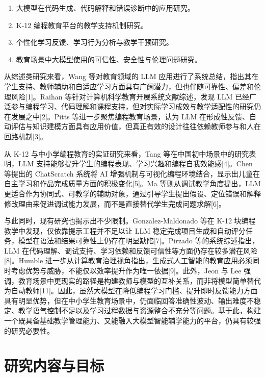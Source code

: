 \begin{enumerate}
\def\labelenumi{(\arabic{enumi})}
\tightlist
\item
  大模型在代码生成、代码解释和错误诊断中的应用研究。
\item
  K-12 编程教育平台的教学支持机制研究。
\item
  个性化学习反馈、学习行为分析与教学干预研究。
\item
  教育场景中大模型使用的可信性、安全性与伦理问题研究。
\end{enumerate}

从综述类研究来看，Wang 等对教育领域的 LLM 应用进行了系统总结，指出其在学生支持、教师辅助和自适应学习方面具有广阔潜力，但也伴随可靠性、偏差和伦理风险{[}1{]}。Raihan 等针对计算机科学教育开展系统文献综述，发现 LLM 已经广泛参与编程学习、代码理解和课程支持，但对实际学习成效与教学适配性的研究仍在发展之中{[}2{]}。Pitts 等进一步聚焦编程教育场景，认为 LLM 在形成性反馈、自动评估与知识建模方面具有应用价值，但真正有效的设计往往依赖教师参与和人在回路机制{[}3{]}。

从 K-12 与中小学编程教育的实证研究来看，Tang 等在中国初中场景中的研究表明，LLM 支持能够提升学生的编程表现、学习兴趣和编程自我效能感{[}4{]}。Chen 等提出的 ChatScratch 系统将 AI 增强机制与可视化编程环境结合，显示出儿童在自主学习和作品完成质量方面的积极变化{[}5{]}。Ma 等则从调试教学角度提出，LLM 更适合作为协同式、可教学的辅助对象，通过引导学生提出假设、定位错误和解释修改理由来促进调试能力发展，而不是直接替代学生完成问题求解{[}6{]}。

与此同时，现有研究也揭示出不少限制。Gonzalez-Maldonado 等在 K-12 块编程教学中发现，仅依靠提示工程并不足以让 LLM 稳定完成项目生成和自动评分任务，模型在语法和结果可靠性上仍存在明显缺陷{[}7{]}。Pirzado 等的系统综述指出，LLM 在代码理解、调试支持、学习依赖和反馈可信性等方面仍存在较多潜在风险{[}8{]}。Humble 进一步从计算教育治理视角指出，生成式人工智能的教育应用必须同时考虑优势与威胁，不能仅以效率提升作为唯一依据{[}9{]}。此外，Jeon 与 Lee 强调，教育场景中更现实的路径是构建教师与模型的互补关系，而非将模型简单替代为自动教师{[}11{]}。因此，虽然大模型在降低编程学习门槛、提升即时反馈能力方面具有明显优势，但在中小学生教育场景中，仍面临回答准确性波动、输出难度不稳定、教学语气控制不足以及学习过程数据与资源整合不充分等问题。基于此，构建一个既具备基础教学管理能力、又能融入大模型智能辅学能力的平台，仍具有较强的研究必要性。

\section{研究内容与目标}\label{ux7814ux7a76ux5185ux5bb9ux4e0eux76eeux6807}

